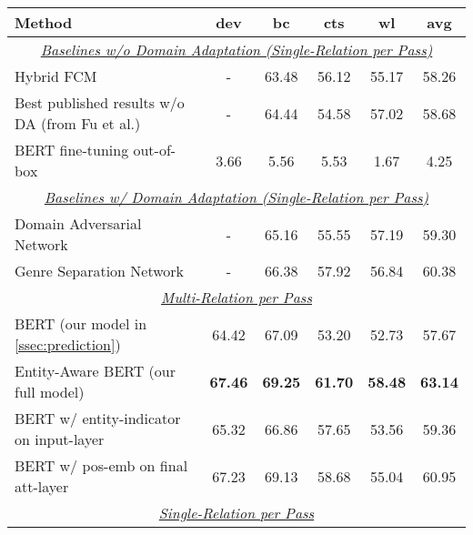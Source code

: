 \documentclass[11pt,a4paper]{article}
\begin{document}
\begin{table*}[!htbp]
\centering
\small
\begin{tabular}{lccccc}
\toprule
\textbf{Method}                                                                                           & \textbf{dev} & \textbf{bc}    & \textbf{cts}   & \textbf{wl}    & \textbf{avg}   \\ \midrule
\multicolumn{6}{c}{\underline{\emph{Baselines w/o Domain Adaptation (Single-Relation per Pass)}}} \\ 
Hybrid FCM \cite{gormley2015improved}                                                       & -            & 63.48          & 56.12          & 55.17          & 58.26          \\ 
Best published results w/o DA (from Fu et al.) & -            & 64.44          & 54.58          & 57.02          & 58.68          \\ 
BERT fine-tuning out-of-box                                                                                           & 3.66         & 5.56           & 5.53           & 1.67           & 4.25           \\ 
\midrule
\multicolumn{6}{c}{\underline{\emph{Baselines w/ Domain Adaptation (Single-Relation per Pass)}}} \\ 
Domain Adversarial Network \cite{fu2017domain}  &-& 65.16          & 55.55          & 57.19          & 59.30          \\ 
Genre Separation Network \cite{shi2018genre}                & -            & 66.38          & 57.92          & 56.84          & 60.38          \\ 
\midrule
\multicolumn{6}{c}{\underline{\emph{Multi-Relation per Pass}}} \\ 
BERT (our model in \cref{ssec:prediction}) & 64.42        & 67.09          & 53.20          & 52.73          & 57.67          \\ 
Entity-Aware BERT (our full model) & \bf 67.46        & \bf 69.25          & \bf 61.70          & \textbf{58.48} & \textbf{63.14} \\
BERT w/ entity-indicator on input-layer &   65.32      &      66.86     &     57.65      &     53.56      &     59.36      \\ 
BERT w/ pos-emb on final att-layer                           & 67.23        & 69.13          & 58.68          & 55.04          & 60.95          \\
\midrule
\multicolumn{6}{c}{\underline{\emph{Single-Relation per Pass}}} \\ 

\end{tabular}
\end{table*}
\end{document}
